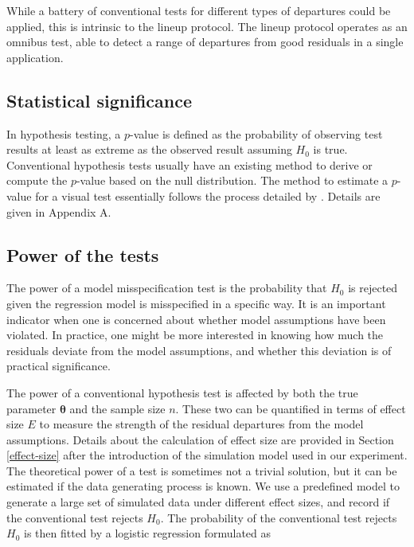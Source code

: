 \documentclass[]{interact}
\theoremstyle{plain}%
\theoremstyle{definition}
\theoremstyle{remark}
\begin{document}
While a battery of conventional tests for different types of departures
could be applied, this is intrinsic to the lineup protocol. The lineup
protocol operates as an omnibus test, able to detect a range of
departures from good residuals in a single application.

\hypertarget{statistical-significance}{%
\subsection{\texorpdfstring{Statistical
significance\label{sig}}{Statistical significance}}\label{statistical-significance}}

In hypothesis testing, a \(p\)-value is defined as the probability of
observing test results at least as extreme as the observed result
assuming \(H_0\) is true. Conventional hypothesis tests usually have an
existing method to derive or compute the \(p\)-value based on the null
distribution. The method to estimate a \(p\)-value for a visual test
essentially follows the process detailed by
\citet{vanderplas2021statistical}. Details are given in Appendix A.

\hypertarget{power-of-the-tests}{%
\subsection{Power of the tests}\label{power-of-the-tests}}

The power of a model misspecification test is the probability that
\(H_0\) is rejected given the regression model is misspecified in a
specific way. It is an important indicator when one is concerned about
whether model assumptions have been violated. In practice, one might be
more interested in knowing how much the residuals deviate from the model
assumptions, and whether this deviation is of practical significance.

The power of a conventional hypothesis test is affected by both the true
parameter \(\boldsymbol{\theta}\) and the sample size \(n\). These two
can be quantified in terms of effect size \(E\) to measure the strength
of the residual departures from the model assumptions. Details about the
calculation of effect size are provided in Section \ref{effect-size}
after the introduction of the simulation model used in our experiment.
The theoretical power of a test is sometimes not a trivial solution, but
it can be estimated if the data generating process is known. We use a
predefined model to generate a large set of simulated data under
different effect sizes, and record if the conventional test rejects
\(H_0\). The probability of the conventional test rejects \(H_0\) is
then fitted by a logistic regression formulated as
\end{document}
